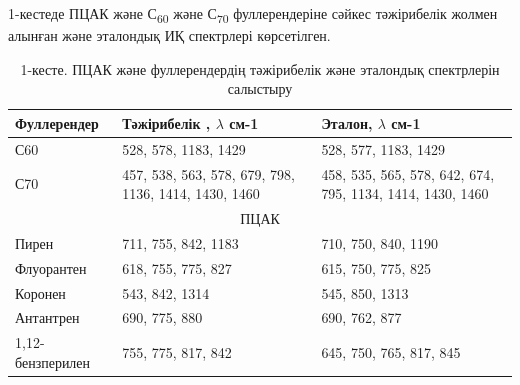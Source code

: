 1-кестеде ПЦАК және С\textsubscript{60} және С\textsubscript{70}
фуллерендеріне сәйкес тәжірибелік жолмен алынған және эталондық ИҚ
спектрлері көрсетілген.

\begin{table}[H]
\caption*{1-кесте. ПЦАК және фуллерендердің тәжірибелік және эталондық спектрлерін салыстыру}
\centering
\begin{tabular}{|lll|}
\hline
\multicolumn{1}{|l|}{Фуллерендер} & \multicolumn{1}{l|}{Тәжірибелік , $\lambda$ см-1} & Эталон, $\lambda$ см-1 \\ \hline
\multicolumn{1}{|l|}{С60} & \multicolumn{1}{l|}{528, 578, 1183, 1429} & 528, 577,  1183, 1429 \\ \hline
\multicolumn{1}{|l|}{С70} & \multicolumn{1}{p{0.3\textwidth}|}{457, 538, 563, 578, 679, 798, 1136, 1414, 1430, 1460} & \multicolumn{1}{p{0.3\textwidth}|}{458, 535, 565, 578, 642, 674, 795, 1134, 1414, 1430, 1460} \\ \hline
\multicolumn{3}{|c|}{ПЦАК} \\ \hline
\multicolumn{1}{|l|}{Пирен} & \multicolumn{1}{l|}{711, 755, 842, 1183} & 710, 750, 840, 1190 \\ \hline
\multicolumn{1}{|l|}{Флуорантен} & \multicolumn{1}{l|}{618, 755, 775, 827} & 615, 750, 775, 825 \\ \hline
\multicolumn{1}{|l|}{Коронен} & \multicolumn{1}{l|}{543, 842, 1314} & 545, 850, 1313 \\ \hline
\multicolumn{1}{|l|}{Антантрен} & \multicolumn{1}{l|}{690, 775, 880} & 690, 762, 877 \\ \hline
\multicolumn{1}{|l|}{1,12-бензперилен} & \multicolumn{1}{l|}{755, 775, 817, 842} & 645, 750, 765, 817, 845 \\ \hline
\end{tabular}
\end{table}

